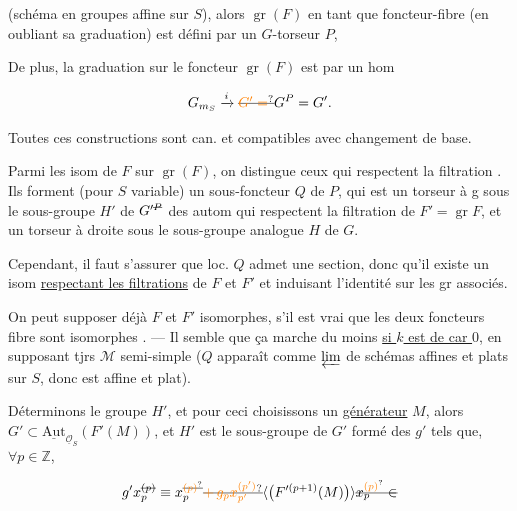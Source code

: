 (schéma en groupes affine sur $S$), alors $\operatorname{gr}(F)$ en tant que foncteur-fibre (en oubliant sa graduation) est défini par un $G$-torseur $P$, 

De plus, la graduation sur  le foncteur  $\operatorname{gr}(F)$ est  par un hom

\[
G_{m_S}\xrightarrow{i}\deleted{\unsure{G'=}}G^P=G'.
\]

Toutes ces constructions sont can. et compatibles avec changement de base.

Parmi les isom de $F$ sur $\operatorname{gr}(F)$, on distingue ceux qui respectent la filtration . Ils forment (pour $S$ variable) un sous-foncteur $Q$ de $P$, qui est un torseur à g sous le sous-groupe $H'$ de $G'^{\deleted{P}}$ des autom qui respectent la filtration  de $F'=\operatorname{gr}F$, et un torseur à droite sous le sous-groupe analogue $H$ de $G$.


Cependant,  il faut s'assurer que loc.  $Q$ admet une section, donc qu'il existe un isom \uline{respectant les filtrations} de $F$ et $F'$ et induisant l'identité sur les gr associés.

On peut supposer déjà $F$ et $F'$ isomorphes,  s'il est vrai que les deux foncteurs fibre sont isomorphes . --- Il semble que ça marche du moins  \uline{si $k$ est de car $0$}, en supposant tjrs $\mathcal M$ semi-simple ($Q$ apparaît comme $\varprojlim$ de schémas affines et plats sur $S$, donc est affine et plat).


Déterminons le groupe $H'$, et pour ceci choisissons un \uline{générateur} $M$, alors $G'\subset\underline{\mathrm{Aut}}_{\underline{\mathcal O}_S}(F'(M))$, et $H'$ est le sous-groupe de $G'$ formé des $g'$ tels que, $\forall p\in\mathbb Z$,

\[
g'x_{p}^{\deleted{(p)}}\equiv x_{p}^{\deleted{\unsure{(p)}}}
\deleted{\unsure{+\,g_p x_{p'}^{(p')}}}
\inserted{\bigl(F'^{(p+1)}(M)\bigr)}
\deleted{x_{p}^{\unsure{(p)}}\in}
\]

